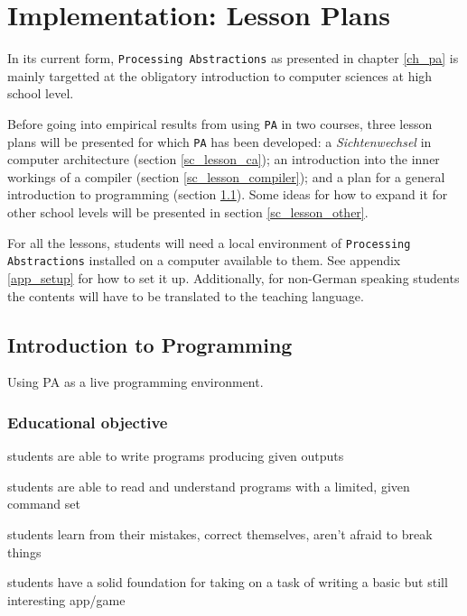 
\chapter{Implementation: Lesson Plans} \label{ch_teaching}
In its current form, \texttt{Processing Abstractions} as presented in chapter \ref{ch_pa} is mainly targetted at the obligatory introduction to computer sciences at high school level.

Before going into empirical results from using \texttt{PA} in two courses, three lesson plans will be presented for which \texttt{PA} has been developed: a \emph{Sichtenwechsel} in computer architecture (section \ref{sc_lesson_ca}); an introduction into the inner workings of a compiler (section \ref{sc_lesson_compiler}); and a plan for a general introduction to programming (section \ref{sc_lesson_intro}). Some ideas for how to expand it for other school levels will be presented in section \ref{sc_lesson_other}.

For all the lessons, students will need a local environment of \texttt{Processing Abstractions} installed on a computer available to them. See appendix \ref{app_setup} for how to set it up. Additionally, for non-German speaking students the contents will have to be translated to the teaching language.

\section{Introduction to Programming} \label{sc_lesson_intro}
Using PA as a live programming environment.

\subsection{Educational objective}

\begin{todo}
\item students are able to write programs producing given outputs
\item students are able to read and understand programs with a limited, given command set
\item students learn from their mistakes, correct themselves, aren't afraid to break things
\item students have a solid foundation for taking on a task of writing a basic but still interesting app/game
\end{todo}

